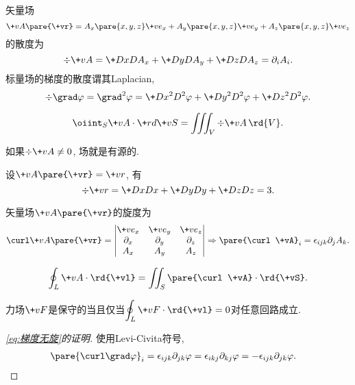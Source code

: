 \documentclass{ctexart}
\def\laplacian{\grad^2}
\begin{document}
矢量场
\[ \+vA\pare{\+vr} = A_x\pare{x,y,z}\+ve_x + A_y\pare{x,y,z}\+ve_y + A_z\pare{x,y,z}\+ve_z \]
的散度为
\[ \div \+vA = \+DxD{A_x} + \+DyD{A_y} + \+DzD{A_z} = \partial_i A_i. \]
标量场的梯度的散度谓其Laplacian,
\[ \div\grad \varphi = \laplacian \varphi = \+D{x^2}D{^2\varphi}+\+D{y^2}D{^2\varphi}+\+D{z^2}D{^2\varphi}. \]
\begin{finale}
    \begin{theorem}
        \[ \oiint_S \+vA\cdot\+rd{\+vS} = \iiint_V \div\+vA \,\rd{V}. \]
    \end{theorem}
\end{finale}
\begin{remark}
    如果$\div\+vA\neq 0$, 场就是有源的.
\end{remark}
\begin{sample}
    \begin{ex}
        设$\+vA\pare{\+vr} = \+vr$, 有
        \[ \div\+vr = \+DxDx + \+DyDy + \+DzDz = 3. \]
    \end{ex}
\end{sample}
矢量场$\+vA\pare{\+vr}$的旋度为
\[ \curl \+vA\pare{\+vr} = \begin{vmatrix}
    \+ve_x & \+ve_y & \+ve_z \\
    \partial_x & \partial_y & \partial_z \\
    A_x & A_y & A_z
\end{vmatrix} \Rightarrow \pare{\curl\+vA}_i = \epsilon_{ijk}\partial_j A_k. \]
\begin{finale}
    \begin{theorem}[Stokes定理]
        \[ \oint_L \+vA\cdot\rd{\+vl} = \iint_S \pare{\curl\+vA}\cdot\rd{\+vS}. \]
    \end{theorem}
\end{finale}
\begin{remark}
    力场$\+vF$是保守的当且仅当$\displaystyle\oint_L \+vF\cdot\rd{\+vl} = 0$对任意回路成立.
\end{remark}
\begin{proof}[\eqref{eq:梯度无旋}的证明]
    使用Levi-Civita符号,
    \begin{align*}
        \pare{\curl\grad\varphi}_i &= \epsilon_{ijk}\partial_{jk}\varphi = \epsilon_{ikj}\partial_{kj}\varphi = -\epsilon_{ijk}\partial_{jk}\varphi. \qedhere
    \end{align*}
\end{proof}
\end{document}
